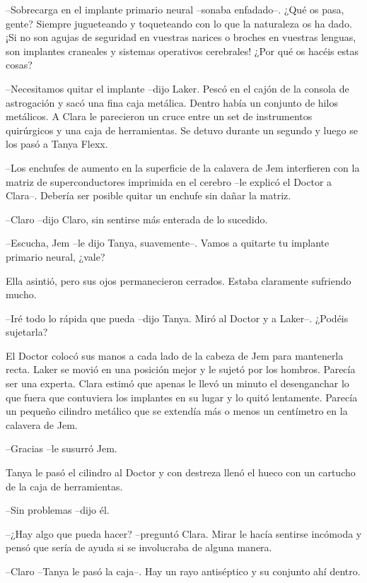 {--Sobrecarga en el implante primario neural --sonaba enfadado--. ¿Qué os
 pasa, gente? Siempre jugueteando y toqueteando con lo que la naturaleza
 os ha dado. ¡Si no son agujas de seguridad en vuestras narices o broches
 en vuestras lenguas, son implantes craneales y sistemas operativos
cerebrales! ¿Por qué os hacéis estas cosas?}

{--Necesitamos quitar el implante --dijo Laker. Pescó en el cajón de la
 consola de astrogación y sacó una fina caja metálica. Dentro había un
 conjunto de hilos metálicos. A Clara le parecieron un cruce entre un set
 de instrumentos quirúrgicos y una caja de herramientas. Se detuvo
durante un segundo y luego se los pasó a Tanya Flexx.}

{--Los enchufes de aumento en la superficie de la calavera de Jem
 interfieren con la matriz de superconductores imprimida en el cerebro
 --le explicó el Doctor a Clara--. Debería ser posible quitar un enchufe
sin dañar la matriz.}

{--Claro --dijo Claro, sin sentirse más enterada de lo sucedido.}

{--Escucha, Jem --le dijo Tanya, suavemente--. Vamos a quitarte tu
implante primario neural, ¿vale?}

{Ella asintió, pero sus ojos permanecieron cerrados. Estaba claramente
sufriendo mucho.}

{--Iré todo lo rápida que pueda --dijo Tanya. Miró al Doctor y a Laker--.
¿Podéis sujetarla?}

{El Doctor colocó sus manos a cada lado de la cabeza de Jem para
 mantenerla recta. Laker se movió en una posición mejor y le sujetó por
 los hombros. Parecía ser una experta. Clara estimó que apenas le llevó
 un minuto el desenganchar lo que fuera que contuviera los implantes en
 su lugar y lo quitó lentamente. Parecía un pequeño cilindro metálico que
se extendía más o menos un centímetro en la calavera de Jem.}

{--Gracias --le susurró Jem.}

{Tanya le pasó el cilindro al Doctor y con destreza llenó el hueco con un
cartucho de la caja de herramientas.}

{--Sin problemas --dijo él.}

{--¿Hay algo que pueda hacer? --preguntó Clara. Mirar le hacía sentirse
 incómoda y pensó que sería de ayuda si se involucraba de alguna
manera.}

{--Claro --Tanya le pasó la caja--. Hay un rayo antiséptico y su conjunto
ahí dentro.}

